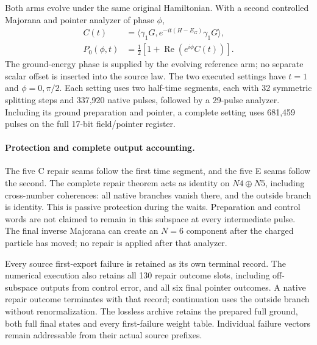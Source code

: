 Both arms evolve under the same original Hamiltonian.  With a second
controlled Majorana and pointer analyzer of phase $\phi$,
\begin{align*}
C(t)&=\langle\gamma_1G,e^{-it(H-E_G)}\gamma_1G\rangle,\\
P_0(\phi,t)&=\tfrac12\left[1+\operatorname{Re}
                         (e^{i\phi}C(t))\right].
\end{align*}
The ground-energy phase is supplied by the evolving reference arm;
no separate scalar offset is inserted into the source law.
The two executed settings have $t=1$ and $\phi=0,\pi/2$.
Each setting uses two half-time segments, each with 32 symmetric
splitting steps and 337,920 native pulses, followed by a 29-pulse
analyzer.  Including its ground preparation and pointer, a complete
setting uses 681,459 pulses on the full 17-bit field/pointer register.

\paragraph{Protection and complete output accounting.}
The five C repair seams follow the first time segment, and the five E
seams follow the second.  The complete repair theorem acts as identity
on $N4\oplus N5$, including cross-number coherences: all native branches
vanish there, and the outside branch is identity.  This is passive
protection during the waits.  Preparation and control words are not
claimed to remain in this subspace at every intermediate pulse.
The final inverse Majorana can create an $N=6$ component after the
charged particle has moved; no repair is applied after that analyzer.

Every source first-export failure is retained as its own terminal
record.  The numerical execution also retains all 130 repair outcome
slots, including off-subspace outputs from control error, and all six
final pointer outcomes.  A native repair outcome terminates with that
record; continuation uses the outside branch without renormalization.
The lossless archive retains the prepared full ground, both full final
states and every first-failure weight table.  Individual failure vectors
remain addressable from their actual source prefixes.


